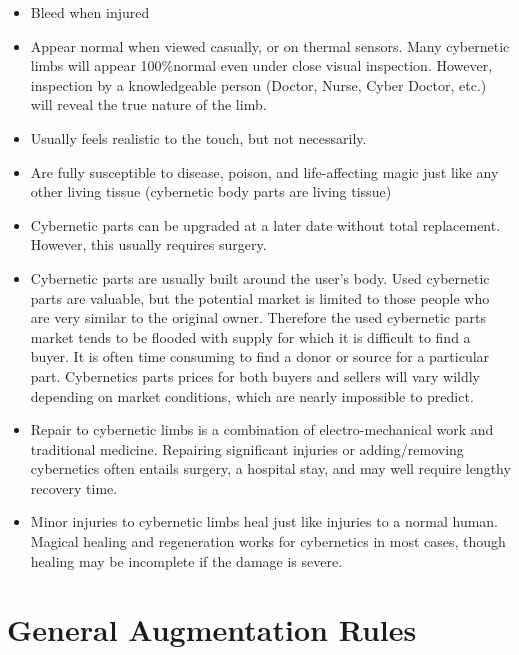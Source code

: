 \documentclass[twoside]{book}
\begin{document}
\begin{itemize}
      
  \item Bleed when injured
  \item Appear normal when viewed casually, or on thermal sensors. Many cybernetic limbs will appear 100\%normal even under close visual inspection. However, inspection by a knowledgeable person (Doctor, Nurse, Cyber Doctor, etc.) will reveal the true nature of the limb.
  \item Usually feels realistic to the touch, but not necessarily.
  \item Are fully susceptible to disease, poison, and life-affecting magic just like any other living tissue (cybernetic body parts are living tissue)
  \item Cybernetic parts can be upgraded at a later date without total replacement. However, this usually requires surgery.
  \item Cybernetic parts are usually built around the user's body. Used cybernetic parts are valuable, but the potential market is limited to those people who are very similar to the original owner. Therefore the used cybernetic parts market tends to be flooded with supply for which it is difficult to find a buyer. It is often time consuming to find a donor or source for a particular part. Cybernetics parts prices for both buyers and sellers will vary wildly depending on market conditions, which are nearly impossible to predict.
  \item Repair to cybernetic limbs is a combination of electro-mechanical work and traditional medicine. Repairing significant injuries or adding/removing cybernetics often entails surgery, a hospital stay, and may well require lengthy recovery time.
  \item Minor injuries to cybernetic limbs heal just like injuries to a normal human. Magical healing and regeneration works for cybernetics in most cases, though healing may be incomplete if the damage is severe.
\end{itemize}
  
    

\section{General Augmentation Rules}
    
\end{document}
